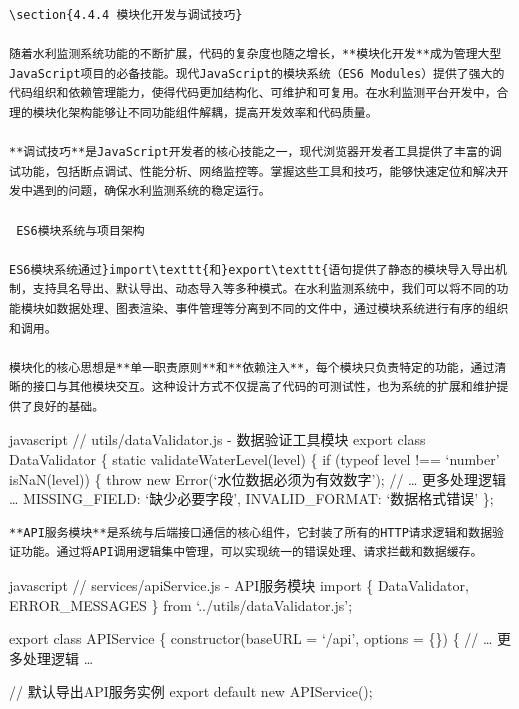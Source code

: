 {{\begin{lstlisting}
\section{4.4.4 模块化开发与调试技巧}

随着水利监测系统功能的不断扩展，代码的复杂度也随之增长，**模块化开发**成为管理大型JavaScript项目的必备技能。现代JavaScript的模块系统（ES6 Modules）提供了强大的代码组织和依赖管理能力，使得代码更加结构化、可维护和可复用。在水利监测平台开发中，合理的模块化架构能够让不同功能组件解耦，提高开发效率和代码质量。

**调试技巧**是JavaScript开发者的核心技能之一，现代浏览器开发者工具提供了丰富的调试功能，包括断点调试、性能分析、网络监控等。掌握这些工具和技巧，能够快速定位和解决开发中遇到的问题，确保水利监测系统的稳定运行。

 ES6模块系统与项目架构

ES6模块系统通过}import\texttt{和}export\texttt{语句提供了静态的模块导入导出机制，支持具名导出、默认导出、动态导入等多种模式。在水利监测系统中，我们可以将不同的功能模块如数据处理、图表渲染、事件管理等分离到不同的文件中，通过模块系统进行有序的组织和调用。

模块化的核心思想是**单一职责原则**和**依赖注入**，每个模块只负责特定的功能，通过清晰的接口与其他模块交互。这种设计方式不仅提高了代码的可测试性，也为系统的扩展和维护提供了良好的基础。
\end{lstlisting}

javascript // utils/dataValidator.js - 数据验证工具模块 export class DataValidator \{ static validateWaterLevel(level) \{ if (typeof level !== `number' \textbar\textbar{} isNaN(level)) \{ throw new Error(`水位数据必须为有效数字'); // \ldots{} 更多处理逻辑 \ldots{} MISSING\_FIELD: `缺少必要字段', INVALID\_FORMAT: `数据格式错误' \};

\begin{lstlisting}
**API服务模块**是系统与后端接口通信的核心组件，它封装了所有的HTTP请求逻辑和数据验证功能。通过将API调用逻辑集中管理，可以实现统一的错误处理、请求拦截和数据缓存。
\end{lstlisting}

javascript // services/apiService.js - API服务模块 import \{ DataValidator, ERROR\_MESSAGES \} from `../utils/dataValidator.js';

export class APIService \{ constructor(baseURL = `/api', options = \{\}) \{ // \ldots{} 更多处理逻辑 \ldots{}

// 默认导出API服务实例 export default new APIService();

}}
